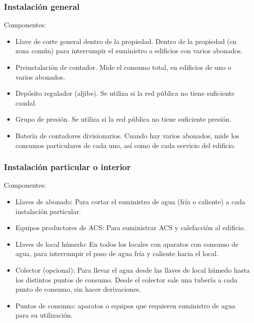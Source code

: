 \subsubsection{Instalación general}
Componentes:
\begin{itemize}
    \item Llave de corte general dentro de la propiedad. Dentro de la propiedad (en zona común) para interrumpir el suministro a edificios con varios abonados.
    \item Preinstalación de contador. Mide el consumo total, en edificios de uno o varios abonados.
    \item Depósito regulador (aljibe). Se utiliza si la red pública no tiene suficiente caudal.
    \item Grupo de presión. Se utiliza si la red pública no tiene suficiente presión.
    \item Batería de contadores divisionarios. Cuando hay varios abonados, mide los consumos particulares de cada uno, así como de cada servicio del edificio.
\end{itemize}

\subsubsection{Instalación particular o interior}
Componentes:
\begin{itemize}
    \item Llaves de abonado: Para cortar el suministro de agua (fría o caliente) a cada instalación particular.
    \item Equipos productores de ACS: Para suministrar ACS y calefacción al edificio.
    \item Llaves de local húmedo: En todos los locales con aparatos con consumo de agua, para interrumpir el paso de agua fría y caliente hacia el local.
    \item Colector (opcional): Para llevar el agua desde las llaves de local húmedo hasta los distintos puntos de consumo. Desde el colector sale una tubería a cada punto de consumo, sin hacer derivaciones.
    \item Puntos de consumo: aparatos o equipos que requieren suministro de agua para su utilización.
\end{itemize}